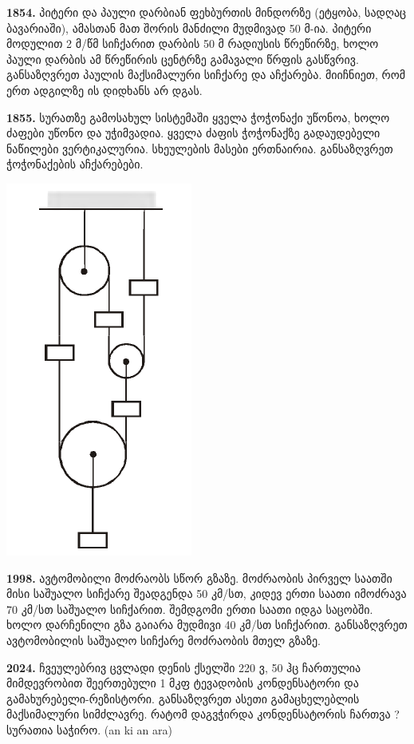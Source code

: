 \documentclass[12pt,a4paper,]{report}
\begin{document}
\textbf{1854.} პიტერი და პაული დარბიან ფეხბურთის მინდორზე (ეტყობა, სადღაც ბავარიაში), ამასთან მათ შორის მანძილი მუდმივად 50 მ-ია. პიტერი მოდულით 2 მ/წმ სიჩქარით დარბის 50 მ რადიუსის წრეწირზე, ხოლო პაული დარბის ამ წრეწირის ცენტრზე გამავალი წრფის გასწვრივ. განსაზღვრეთ პაულის მაქსიმალური სიჩქარე და აჩქარება. მიიჩნიეთ, რომ ერთ ადგილზე ის დიდხანს არ დგას.

\textbf{1855.} სურათზე გამოსახულ სისტემაში ყველა ჭოჭონაქი უწონოა, ხოლო ძაფები უწონო და უჭიმვადია. ყველა ძაფის ჭოჭონაქზე გადაუდებელი ნაწილები ვერტიკალურია. სხეულების მასები ერთნაირია. განსაზღვრეთ ჭოჭონაქების აჩქარებები. 
		\begin{center}
			\includegraphics[scale=0.5]{images/F1855.png}
		\end{center}
	
\textbf{1998.} ავტომობილი მოძრაობს სწორ გზაზე. მოძრაობის პირველ საათში მისი საშუალო სიჩქარე შეადგენდა 50 კმ/სთ, კიდევ ერთი საათი იმოძრავა 70 კმ/სთ საშუალო სიჩქარით. შემდგომი ერთი საათი იდგა საცობში. ხოლო დარჩენილი გზა გაიარა მუდმივი 40 კმ/სთ სიჩქარით. განსაზღვრეთ ავტომობილის საშუალო სიჩქარე მოძრაობის მთელ გზაზე.

\textbf{2024.} ჩვეულებრივ ცვლადი დენის ქსელში 220 ვ, 50 ჰც ჩართულია მიმდევრობით შეერთებული 1 მკფ ტევადობის კონდენსატორი და გამახურებელი-რეზისტორი. განსაზღვრეთ  ასეთი გამაცხელებლის მაქსიმალური სიმძლავრე. რატომ დაგვჭირდა კონდენსატორის ჩართვა ? 
სურათია საჭირო. (an ki an ara)
\end{document}
